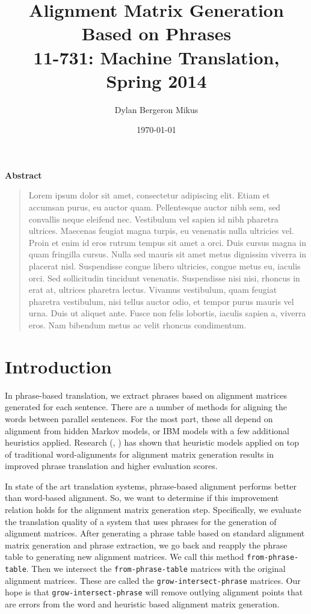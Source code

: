 \documentclass[twocolumn]{article}
\title{Alignment Matrix Generation Based on Phrases \\
  11-731: Machine Translation, Spring 2014}
\date{\today}
\author{Dylan Bergeron Mikus}
\newcommand{\phraseAlign}{\texttt{from-phrase-table}}
\newcommand{\phraseIntersectAlign}{\texttt{grow-intersect-phrase}}
\begin{document}
\maketitle{}

\begin{center}
\Large{\textbf{Abstract}}
\end{center}
\begin{quotation}
  \small{
    Lorem ipsum dolor sit amet, consectetur adipiscing elit. Etiam et accumsan
    purus, eu auctor quam. Pellentesque auctor nibh sem, sed convallis neque
    eleifend nec. Vestibulum vel sapien id nibh pharetra ultrices. Maecenas
    feugiat  magna turpis, eu venenatis nulla ultricies vel. Proin et enim id
    eros rutrum  tempus sit amet a orci. Duis cursus magna in quam fringilla
    cursus. Nulla sed  mauris sit amet metus dignissim viverra in placerat
    nisl. Suspendisse congue  libero ultricies, congue metus eu, iaculis
    orci. Sed sollicitudin tincidunt venenatis. Suspendisse nisi nisi, rhoncus
    in erat at, ultrices pharetra lectus. Vivamus vestibulum, quam feugiat
    pharetra vestibulum, nisi tellus auctor odio, et tempor purus mauris vel
    urna. Duis ut aliquet ante. Fusce non felis lobortis, iaculis sapien a,
    viverra eros. Nam bibendum metus ac velit rhoncus condimentum.
  }
\end{quotation}


\section{Introduction}
In phrase-based translation, we extract phrases based on alignment matrices
generated for each sentence. There are a number of methods for aligning the
words between parallel sentences. For the most part, these all depend on
alignment from hidden Markov models, or IBM models with a few additional
heuristics applied. Research (\cite{wuwang2007}, \cite{dgzk2006}) has shown that
heuristic models applied on top of traditional word-alignments for alignment
matrix generation results in improved phrase translation and higher evaluation
scores.

In state of the art translation systems, phrase-based alignment performs better
than word-based alignment. So, we want to determine if this improvement relation
holds for the alignment matrix generation step. Specifically, we evaluate the
translation quality of a system that uses phrases for the generation of
alignment matrices. After generating a phrase table based on standard alignment
matrix generation and phrase extraction, we go back and reapply the phrase table
to generating new alignment matrices. We call this method \phraseAlign{}.
Then we intersect the \phraseAlign{} matrices with the original alignment
matrices. These are called the \phraseIntersectAlign{} matrices.
Our hope is that \phraseIntersectAlign{} will remove outlying alignment points
that are errors from the word and heuristic based alignment matrix generation.
\end{document}

